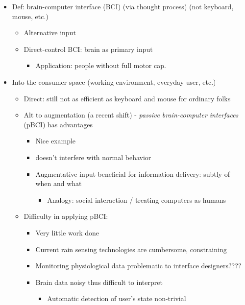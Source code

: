\documentclass[11pt]{article}
\begin{document}
\begin{itemize}
\item
  Def: brain-computer interface (BCI) (via thought process) (not
  keyboard, mouse, etc.)

  \begin{itemize}
  \itemsep1pt\parskip0pt
  \item
    Alternative input
  \item
    Direct-control BCI: brain as primary input

    \begin{itemize}
    \itemsep1pt\parskip0pt
    \item
      Application: people without full motor cap.
    \end{itemize}
  \end{itemize}
\item
  Into the consumer space (working environment, everyday user, etc.)

  \begin{itemize}
  \itemsep1pt\parskip0pt
  \item
    Direct: still not as efficient as keyboard and mouse for ordinary
    folks
  \item
    Alt to augmentation (a recent shift) - \emph{passive brain-computer
    interfaces} (pBCI) has advantages

    \begin{itemize}
    \itemsep1pt\parskip0pt
    \item
      Nice example
    \item
      doesn't interfere with normal behavior
    \item
      Augmentative input beneficial for information delivery: subtly of
      when and what

      \begin{itemize}
      \itemsep1pt\parskip0pt
      \item
        Analogy: social interaction / treating computers as humans
      \end{itemize}
    \end{itemize}
  \item
    Difficulty in applying pBCI:

    \begin{itemize}
    \itemsep1pt\parskip0pt
    \item
      Very little work done
    \item
      Current rain sensing technologies are cumbersome, constraining
    \item
      Monitoring physiological data problematic to interface
      designers????
    \item
      Brain data noisy thus difficult to interpret

      \begin{itemize}
      \itemsep1pt\parskip0pt
      \item
        Automatic detection of user's state non-trivial
      \end{itemize}
    \end{itemize}
  \end{itemize}
\end{itemize}
\end{document}

